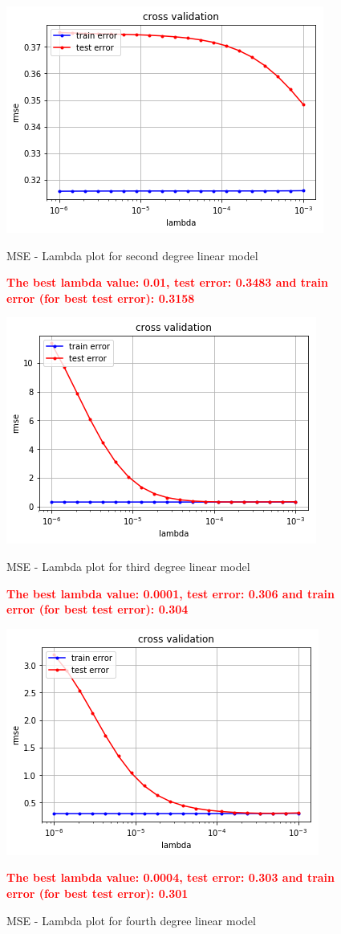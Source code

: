 \documentclass[10pt,conference,compsocconf]{IEEEtran}
\begin{document}
\begin{center}
\begin{figure}
\includegraphics[scale=0.4]{linear_2}
\centering
\caption{MSE - Lambda plot for second degree linear model}
\textbf{\textcolor{red}{The best lambda value: 0.01, test error: 0.3483 and train error (for best test error): 0.3158}}
\vspace{5ex}

\includegraphics[scale=0.4]{linear_3}
\centering
\caption{MSE - Lambda plot for third degree linear model}
\textbf{\textcolor{red}{The best lambda value: 0.0001, test error: 0.306 and train error (for best test error): 0.304}}
\vspace{5ex}

\includegraphics[scale=0.4]{linear_4}
\centering
\caption{MSE - Lambda plot for fourth degree linear model}
\textbf{\textcolor{red}{The best lambda value: 0.0004, test error: 0.303 and train error (for best test error): 0.301}}
\vspace{5ex}


\end{figure}
\end{center}
\end{document}
